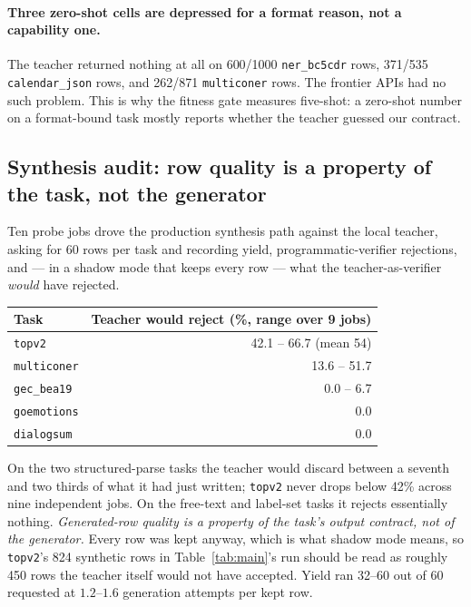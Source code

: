 \documentclass[sigconf,10pt]{acmart}
\newcommand{\tsk}[1]{\texttt{#1}}
\begin{document}
\paragraph{Three zero-shot cells are depressed for a format reason, not a capability one.}
The teacher returned nothing at all on 600/1000 \tsk{ner\_bc5cdr} rows, 371/535
\tsk{calendar\_json} rows, and 262/871 \tsk{multiconer} rows. The frontier APIs had no such
problem. This is why the fitness gate measures five-shot: a zero-shot number on a
format-bound task mostly reports whether the teacher guessed our contract.

\subsection{Synthesis audit: row quality is a property of the task, not the generator}
\label{sec:ablations-synthaudit}

Ten probe jobs drove the production synthesis path against the local teacher, asking for 60
rows per task and recording yield, programmatic-verifier rejections, and --- in a shadow mode
that keeps every row --- what the teacher-as-verifier \emph{would} have rejected.

\begin{center}
\small
\begin{tabular}{@{}lr@{}}
\toprule
Task & Teacher would reject (\%, range over 9 jobs) \\
\midrule
\tsk{topv2}      & 42.1 -- 66.7 \quad (mean 54) \\
\tsk{multiconer} & 13.6 -- 51.7 \\
\tsk{gec\_bea19} & 0.0 -- 6.7 \\
\tsk{goemotions} & 0.0 \\
\tsk{dialogsum}  & 0.0 \\
\bottomrule
\end{tabular}
\end{center}

On the two structured-parse tasks the teacher would discard between a seventh and two thirds
of what it had just written; \tsk{topv2} never drops below 42\% across nine independent jobs.
On the free-text and label-set tasks it rejects essentially nothing. \emph{Generated-row
quality is a property of the task's output contract, not of the generator.} Every row was
kept anyway, which is what shadow mode means, so \tsk{topv2}'s 824 synthetic rows in
Table~\ref{tab:main}'s run should be read as roughly 450 rows the teacher itself would not
have accepted. Yield ran 32--60 out of 60 requested at $1.2$--$1.6$ generation attempts per
kept row.
\end{document}
